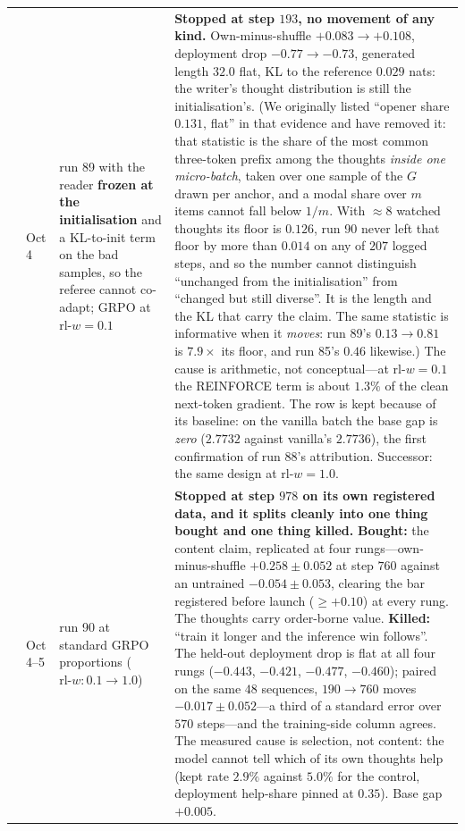 \documentclass{article} %
\begin{document}
{\begin{longtable}{@{}llp{3.6cm}p{5.6cm}@{}}
\addlinespace
90 & Oct 4 & run 89 with the reader \textbf{frozen at the initialisation} and a KL-to-init term on the bad samples, so the referee cannot co-adapt; GRPO at $\textrm{rl-}w = 0.1$ & \textbf{Stopped at step $193$, no movement of any kind.} Own-minus-shuffle $+0.083 \to +0.108$, deployment drop $-0.77 \to -0.73$, generated length $32.0$ flat, KL to the reference $0.029$ nats: the writer's thought distribution is still the initialisation's. (We originally listed ``opener share $0.131$, flat'' in that evidence and have removed it: that statistic is the share of the most common three-token prefix among the thoughts \emph{inside one micro-batch}, taken over one sample of the $G$ drawn per anchor, and a modal share over $m$ items cannot fall below $1/m$. With ${\approx}8$ watched thoughts its floor is $0.126$, run 90 never left that floor by more than $0.014$ on any of $207$ logged steps, and so the number cannot distinguish ``unchanged from the initialisation'' from ``changed but still diverse''. It is the length and the KL that carry the claim. The same statistic is informative when it \emph{moves}: run 89's $0.13 \to 0.81$ is $7.9\times$ its floor, and run 85's $0.46$ likewise.) The cause is arithmetic, not conceptual---at $\textrm{rl-}w = 0.1$ the REINFORCE term is about $1.3\%$ of the clean next-token gradient. The row is kept because of its baseline: on the vanilla batch the base gap is \emph{zero} ($2.7732$ against vanilla's $2.7736$), the first confirmation of run 88's attribution. Successor: the same design at $\textrm{rl-}w = 1.0$. \\
\addlinespace
91 & Oct 4--5 & run 90 at standard GRPO proportions ($\textrm{rl-}w\colon 0.1 \to 1.0$) & \textbf{Stopped at step $978$ on its own registered data, and it splits cleanly into one thing bought and one thing killed.} \textbf{Bought:} the content claim, replicated at four rungs---own-minus-shuffle $+0.258 \pm 0.052$ at step $760$ against an untrained $-0.054 \pm 0.053$, clearing the bar registered before launch ($\ge +0.10$) at every rung. The thoughts carry order-borne value. \textbf{Killed:} ``train it longer and the inference win follows''. The held-out deployment drop is flat at all four rungs ($-0.443$, $-0.421$, $-0.477$, $-0.460$); paired on the same $48$ sequences, $190 \to 760$ moves $-0.017 \pm 0.052$---a third of a standard error over $570$ steps---and the training-side column agrees. The measured cause is selection, not content: the model cannot tell which of its own thoughts help (kept rate $2.9\%$ against $5.0\%$ for the control, deployment help-share pinned at $0.35$). Base gap $+0.005$. \\

\end{longtable}}
\end{document}
